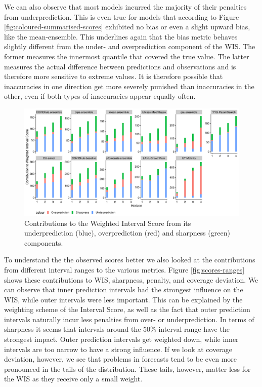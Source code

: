 \documentclass[
]{book}
\begin{document}
We can also observe that most models incurred the majority of their penalties from underprediction. This is even true for models that according to Figure \ref{fig:coloured-summarised-scores} exhibited no bias or even a slight upward bias, like the mean-ensemble. This underlines again that the bias metric behaves slightly different from the under- and overprediction component of the WIS. The former measures the innermost quantile that covered the true value. The latter measures the actual difference between predictions and observations and is therefore more sensitive to extreme values. It is therefore possible that inaccuracies in one direction get more severely punished than inaccuracies in the other, even if both types of inaccuracies appear equally often.

\begin{figure}

{\centering \includegraphics[width=1\linewidth]{../visualisation/chapter-5-results/scenario-baseline/wis-contributions} 

}

\caption{Contributions to the Weighted Interval Score from its underprediction (blue), overprediction (red) and sharpness (green) components.}\label{fig:wis-contributions}
\end{figure}

To understand the the observed scores better we also looked at the contributions from different interval ranges to the various metrics. Figure \ref{fig:scores-ranges} shows these contributions to WIS, sharpness, penalty, and coverage deviation. We can observe that inner prediction intervals had the strongest influence on the WIS, while outer intervals were less important. This can be explained by the weighting scheme of the Interval Score, as well as the fact that outer prediction intervals naturally incur less penalties from over- or underprediction. In terms of sharpness it seems that intervals around the 50\% interval range have the strongest impact. Outer prediction intervals get weighted down, while inner intervals are too narrow to have a strong influence. If we look at coverage deviation, however, we see that problems in forecasts tend to be even more pronounced in the tails of the distribution. These tails, however, matter less for the WIS as they receive only a small weight.
\end{document}
